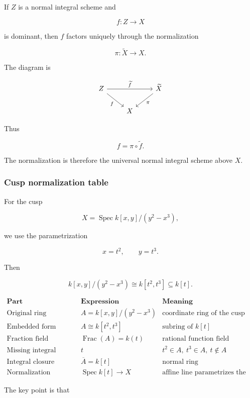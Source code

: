 \documentclass[12pt,a4paper]{article}
\theoremstyle{notespace}
\begin{document}
If \(Z\) is a normal integral scheme and

\[
f:Z\to X
\]

is dominant, then \(f\) factors uniquely through the normalization

\[
\pi:\widetilde{X}\to X.
\]

The diagram is

\[
\begin{tikzcd}
	Z \arrow[rr,"\widetilde{f}"] \arrow[dr,"f"']
	&
	&
	\widetilde{X} \arrow[dl,"\pi"]
	\\
	&
	X
	&
\end{tikzcd}
\]

Thus

\[
f=\pi\circ \widetilde{f}.
\]

The normalization is therefore the universal normal integral scheme above \(X\).

\subsubsection{Cusp normalization table}

For the cusp

\[
X=\operatorname{Spec}k[x,y]/(y^2-x^3),
\]

we use the parametrization

\[
x=t^2,
\qquad
y=t^3.
\]

Then

\[
k[x,y]/(y^2-x^3)\cong k[t^2,t^3]\subseteq k[t].
\]

\[
\begin{array}{c|c|c}
	\textbf{Part} & \textbf{Expression} & \textbf{Meaning} \\
	\hline
	\text{Original ring}
	&
	A=k[x,y]/(y^2-x^3)
	&
	\text{coordinate ring of the cusp}
	\\
	\hline
	\text{Embedded form}
	&
	A\cong k[t^2,t^3]
	&
	\text{subring of }k[t]
	\\
	\hline
	\text{Fraction field}
	&
	\operatorname{Frac}(A)=k(t)
	&
	\text{rational function field}
	\\
	\hline
	\text{Missing integral element}
	&
	t
	&
	t^2\in A,\ t^3\in A,\ t\notin A
	\\
	\hline
	\text{Integral closure}
	&
	\overline{A}=k[t]
	&
	\text{normal ring}
	\\
	\hline
	\text{Normalization}
	&
	\operatorname{Spec}k[t]\to X
	&
	\text{affine line parametrizes the cusp}
\end{array}
\]

The key point is that
\end{document}
